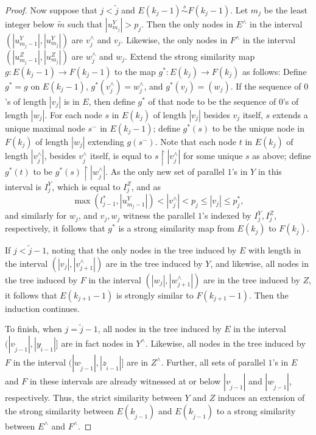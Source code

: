 \documentclass{amsart}
\theoremstyle{remark}
\theoremstyle{definition}
\theoremstyle{remark}
\newcommand{\re}{\restriction}
\newcommand{\ssim}{\stackrel{s}{\sim}}
\newcommand{\ra}{\rightarrow}
\begin{document}
\begin{proof}
Now suppose that $j<\tilde{j}$
and $E(k_j-1)\ssim F(k_j-1)$.
Let $m_j$ be the least integer below $\tilde{m}$ such that
$|u^Y_{m_j}|>p_j$.
Then
the only  nodes in $E^{\wedge}$
in the interval $(|u^Y_{m_j-1}|,|u^Y_{m_j}|)$
are $v_j^{\wedge}$ and $v_j$.
Likewise, the only nodes in $F^{\wedge}$ in the interval
$(|u^Z_{m_j-1}|,|u^Z_{m_j}|)$
are $w_j^{\wedge}$ and $w_j$.
Extend the strong similarity map $g:E(k_j-1)\ra F (k_j-1)$
to the map
$g^*:E(k_j)\ra F(k_j)$
as follows:
Define
$g^*=g$ on $E(k_j-1)$,
 $g^*(v_j^{\wedge})=w_j^{\wedge}$, and
 $g^*(v_j)=(w_j)$.
If the sequence  of  $0$'s of length $|v_j|$ is in $E$,
 then define $g^*$ of that node to be the sequence of $0$'s of length $|w_j|$.
For each node $s$ in $E(k_j)$ of length $|v_j|$ besides $v_j$ itself,
$s$ extends a unique maximal node $s^-$  in $E (k_j-1)$;
define $g^*(s)$ to be the unique node in $F(k_j)$ of length $|w_j|$ extending $g(s^-)$.
Note that
 each node $t$ in $E(k_j)$ of length $|v_j^{\wedge}|$, besides $v_j^{\wedge}$ itself,
is equal to $s\re |v^{\wedge}_j|$ for some unique $s$ as above;
define $g^*(t)$ to be $g^*(s)\re|w^{\wedge}_j|$.
As the only new set of parallel $1$'s in $Y$ in this interval is $I_j^Y$, which is equal to $I_j^Z$,
and as
\begin{equation}
\max(l_{j-1}^*,|u^Y_{m_j-1}|)<|v^{\wedge}_j|<p_j\le |v_j|\le p_j^*,
\end{equation}
and similarly for $w_j$,
and $v_j,w_j$ witness the parallel $1$'s indexed by
$I^Y_j, I^Z_j$, respectively,
it follows that $g^*$ is a strong similarity map from $E(k_j)$ to $F(k_j)$.


If $j<\tilde{j}-1$,
noting that the only nodes in the tree induced by $E$ with
 length in
 the interval $(|v_j|, |v^{\wedge}_{j+1}|)$
are in the tree induced by $Y$,
and likewise, all nodes in the tree induced by $F$ in the interval
$(|w_j|, |w^{\wedge}_{j+1}|)$ are in the tree induced by $Z$,
it follows that $E(k_{j+1}-1)$ is strongly similar to $F(k_{j+1}-1)$.
Then the induction continues.



To finish, when $j=\tilde{j}-1$,
all nodes in the tree induced by
$E$ in the interval $(|v_{\tilde{j}-1}|,|y_{\tilde{i}-1}|]$
are in fact nodes in $Y^{\wedge}$.
Likewise, all nodes in  the tree induced by
 $F$ in the interval $(|w_{\tilde{j}-1}|,|z_{\tilde{i}-1}|]$ are
 in $Z^{\wedge}$.
Further, all sets of parallel $1$'s in $E$ and $F$ in these intervals are already witnessed at or below
$|v_{\tilde{j}-1}|$ and $|w_{\tilde{j}-1}|$, respectively.
Thus, the strict similarity between $Y$ and $Z$ induces
an extension of the strong similarity between
$E(k_{\tilde{j}-1})$
and
$E(k_{\tilde{j}-1})$
to a strong similarity between
$E^{\wedge}$ and $F^{\wedge}$.
\end{proof}
\end{document}
